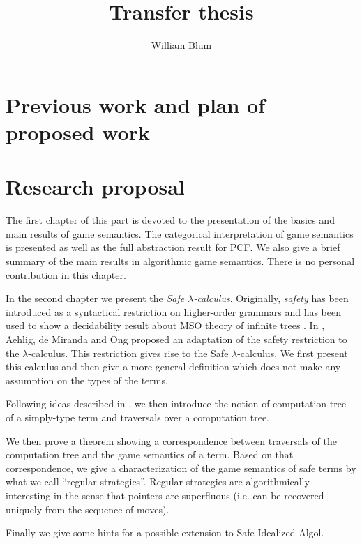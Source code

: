 \documentclass[nocenter,sfbold]{thesis}
\author{William Blum}
\title{Transfer thesis}
\begin{document}
\maketitle \tableofcontents

\part{Previous work and plan of proposed work}




\part{Research proposal}

The first chapter of this part is devoted to the presentation of the
basics and main results of game semantics. The categorical
interpretation of game semantics is presented as well as the full
abstraction result for PCF. We also give a brief summary of the main
results in algorithmic game semantics. There is no personal
contribution in this chapter.

In the second chapter we present the \emph{Safe $\lambda$-calculus}.
Originally, \emph{safety} has been introduced as a syntactical
restriction on higher-order grammars and has been used to show a
decidability result about MSO theory of infinite trees
\citep{KNU02}. In \cite{safety-mirlong2004}, Aehlig, de Miranda and
Ong  proposed an adaptation of the safety restriction to the
$\lambda$-calculus. This restriction gives rise to the Safe
$\lambda$-calculus. We first present this calculus and then give a
more general definition which does not make any assumption on the
types of the terms.

Following ideas described in \cite{OngLics2006}, we then introduce
the notion of computation tree of a simply-type term and traversals
over a computation tree.

We then prove a theorem showing a correspondence between traversals
of the computation tree and the game semantics of a term. Based on
that correspondence, we give a characterization of the game
semantics of safe terms by what we call ``regular strategies''.
Regular strategies are algorithmically interesting in the sense that
pointers are superfluous (i.e. can be recovered uniquely from the
sequence of moves).

Finally we give some hints for a possible extension to Safe
Idealized Algol.











         {\protect{}}
\end{document}

